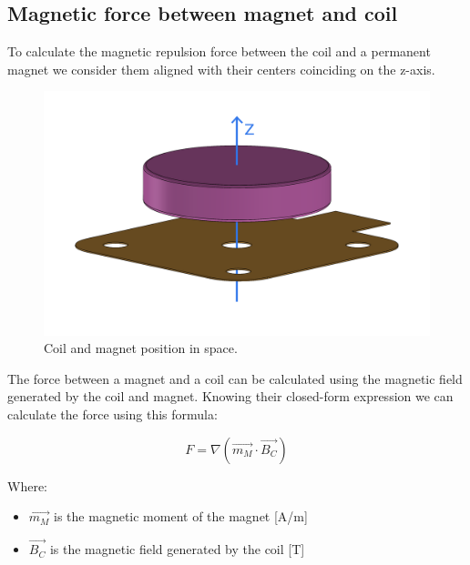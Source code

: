 \subsection{Magnetic force between magnet and coil}

\begin{samepage}
    To calculate the magnetic repulsion force between the coil and a permanent magnet we consider them aligned with their centers coinciding on the z-axis.
    \nopagebreak

    \begin{figure}[H]
        \centering
        \includegraphics[width=0.5\columnwidth]{Chapters/Chapter2/Modelling_of_Entire_System/Figures/coil_magnet.png} 
        \caption[Coil-Magnet position]{Coil and magnet position in space.}
        \label{fig: Coil-Magnet_position}
    \end{figure}
\end{samepage}

\begin{samepage}
    The force between a magnet and a coil can be calculated using the magnetic field generated by the coil and magnet.
    Knowing their closed-form expression we can calculate the force using this formula:
    \nopagebreak

    \begin{equation}
        F = \nabla (\overrightarrow{m_M} \cdot \overrightarrow{B_C}) %
    \end{equation}
    \nopagebreak

    Where: 
    \begin{itemize}
        \item $\overrightarrow{m_M}$ is the magnetic moment of the magnet [A/m]
        \item $\overrightarrow{B_C}$ is the magnetic field generated by the coil [T]
    \end{itemize}
\end{samepage}

